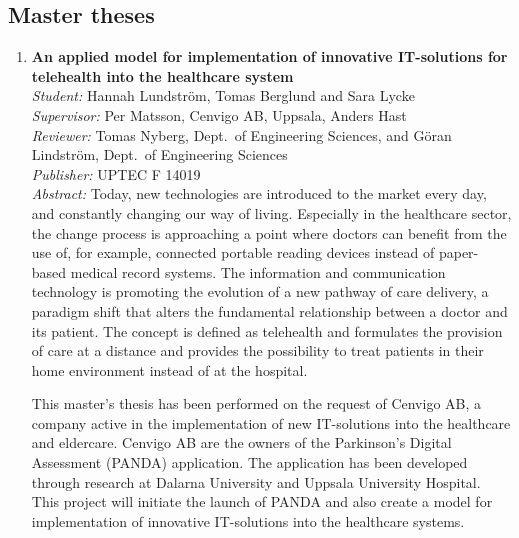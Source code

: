 %
\subsection{Master theses\label{exjobb}}
\begin{small}
\begin{enumerate}



\item\textbf{An applied model for implementation of innovative IT-solutions for telehealth into the healthcare system}\\
  \emph{Student:} Hannah Lundstr\"{o}m, Tomas Berglund and Sara Lycke\\
  \emph{Supervisor:} Per Matsson, Cenvigo AB, Uppsala, Anders Hast \\ 
  \emph{Reviewer:} Tomas Nyberg, Dept.~of Engineering Sciences, and G\"{o}ran Lindstr\"{o}m, Dept.~of Engineering Sciences\\
  \emph{Publisher:} UPTEC F 14019\\
  \emph{Abstract:} Today, new technologies are introduced to the market every day, and constantly changing our way of living. Especially in the healthcare sector, the change process is approaching a point where doctors can benefit from the use of, for example, connected portable reading devices instead of paper-based medical record systems. The information and communication technology is promoting the evolution of a new pathway of care delivery, a paradigm shift that alters the fundamental relationship between a doctor and its patient. The concept is defined as telehealth and formulates the provision of care at a distance and provides the possibility to treat patients in their home environment instead of at the hospital.

This master's thesis has been performed on the request of Cenvigo AB, a company active in the implementation of new IT-solutions into the healthcare and eldercare. Cenvigo AB are the owners of the Parkinson's Digital Assessment (PANDA) application. The application has been developed through research at Dalarna University and Uppsala University Hospital.  This project will initiate the launch of PANDA and also create a model for implementation of innovative IT-solutions into the healthcare systems.


\end{enumerate}
\end{small}
